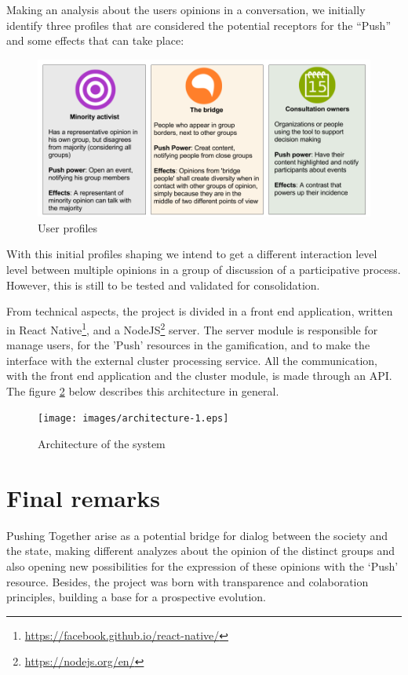 \documentclass{llncs}
\begin{document}
  Making an analysis about the users opinions in a conversation, we initially
  identify three profiles that are considered the potential receptors for the “Push”
  and some effects that can take place: 

 \begin{figure}[H]
   \centering
     \includegraphics[keepaspectratio=true,scale=0.25]{images/userprofiles.png}
   \caption{User profiles}
   \label{fig:userprofiles}
 \end{figure}


  With this initial profiles shaping we intend to get a different interaction level
  level between multiple opinions in a group of discussion of a
  participative process. However, this is still to be tested and validated for
  consolidation.

  From technical aspects, the project is divided in a front end application,
  written in React Native\footnote{\url{https://facebook.github.io/react-native/}},
  and a NodeJS\footnote{\url{https://nodejs.org/en/}} server. The server module is responsible
  for manage users, for the 'Push' resources in the gamification, and to make
  the interface with the external cluster processing service. All the communication,
  with the front end application and the cluster module, is made through an API. 
  The figure \ref{fig:architecture-2} below describes this architecture in general.

 \begin{figure}[H]
   \centering
     \texttt{[image: images/architecture-1.eps]}
   \caption{Architecture of the system}
   \label{fig:architecture-2}
 \end{figure}

\section{Final remarks}
  Pushing Together arise as a potential bridge for dialog between the society
  and the state, making different analyzes about the opinion of the distinct
  groups and also opening new possibilities for the expression of these opinions
  with the ‘Push’ resource. Besides, the project was born with transparence and
  colaboration principles, building a base for a prospective evolution.
\end{document}
